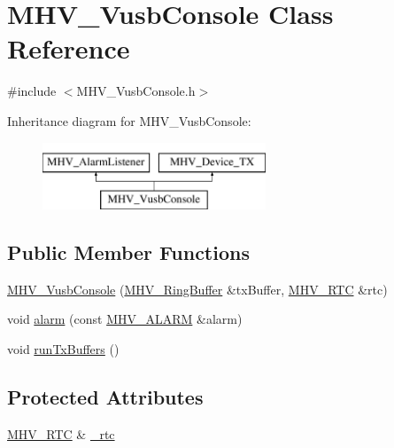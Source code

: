 \hypertarget{class_m_h_v___vusb_console}{
\section{\-M\-H\-V\-\_\-\-Vusb\-Console \-Class \-Reference}
\label{class_m_h_v___vusb_console}
}


{\ttfamily \#include $<$\-M\-H\-V\-\_\-\-Vusb\-Console.\-h$>$}

\-Inheritance diagram for \-M\-H\-V\-\_\-\-Vusb\-Console\-:\begin{figure}[H]
\begin{center}
\leavevmode
\includegraphics[height=2.000000cm]{class_m_h_v___vusb_console}
\end{center}
\end{figure}
\subsection*{\-Public \-Member \-Functions}
\begin{DoxyCompactItemize}
\item 
\hyperlink{class_m_h_v___vusb_console_a1731128afca55ab0450da54b7d2568a6}{\-M\-H\-V\-\_\-\-Vusb\-Console} (\hyperlink{class_m_h_v___ring_buffer}{\-M\-H\-V\-\_\-\-Ring\-Buffer} \&tx\-Buffer, \hyperlink{class_m_h_v___r_t_c}{\-M\-H\-V\-\_\-\-R\-T\-C} \&rtc)
\item 
void \hyperlink{class_m_h_v___vusb_console_acf757e9707869b60a308425f794a9dd0}{alarm} (const \hyperlink{_m_h_v___r_t_c_8h_af13307658f41fba330ffae04dd5cbce6}{\-M\-H\-V\-\_\-\-A\-L\-A\-R\-M} \&alarm)
\item 
void \hyperlink{class_m_h_v___vusb_console_a00956c69813f5a0cbdf0a5cb0555bbbf}{run\-Tx\-Buffers} ()
\end{DoxyCompactItemize}
\subsection*{\-Protected \-Attributes}
\begin{DoxyCompactItemize}
\item 
\hyperlink{class_m_h_v___r_t_c}{\-M\-H\-V\-\_\-\-R\-T\-C} \& \hyperlink{class_m_h_v___vusb_console_a0ccd1ee48d53ee1871f8d1d1ba068825}{\-\_\-rtc}
\end{DoxyCompactItemize}


